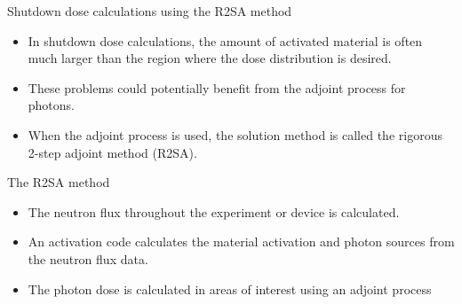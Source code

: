 \documentclass{beamer}
\begin{document}
\begin{frame}{Shutdown dose calculations using the R2SA method}
  
  \begin{itemize}
    \item In shutdown dose calculations, the amount of activated material is
      often much larger than the region where the dose distribution is desired. 
    \item These problems could potentially benefit from the adjoint process
      for photons.
    \item When the adjoint process is used, the solution method is called the
      rigorous 2-step adjoint method (R2SA).
  \end{itemize}

  \medskip
  \medskip

  \begin{beamerboxesrounded}{The R2SA method}
    \begin{itemize}
      \item The neutron flux throughout the experiment or device is calculated.
      \item An activation code calculates the material activation and photon
        sources from the neutron flux data.
      \item The photon dose is calculated in areas of interest using an adjoint
        process 
    \end{itemize}
  \end{beamerboxesrounded}

\end{frame}
\end{document}
